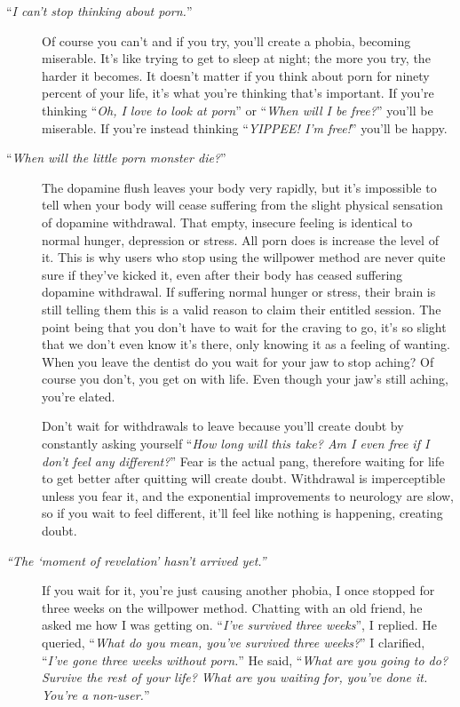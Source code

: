 \documentclass[
]{book}
\begin{document}
\begin{description}
\begin{description}
\item[``\emph{I can't stop thinking about porn.}'']
Of course you can't and if you try, you'll create a phobia, becoming miserable. It's like trying to get to sleep at night; the more you try, the harder it becomes. It doesn't matter if you think about porn for ninety percent of your life, it's what you're thinking that's important. If you're thinking ``\emph{Oh, I love to look at porn}'' or ``\emph{When will I be free?}'' you'll be miserable. If you're instead thinking ``\emph{YIPPEE! I'm free!}'' you'll be happy.
\item[``\emph{When will the little porn monster die?}'']
The dopamine flush leaves your body very rapidly, but it's impossible to tell when your body will cease suffering from the slight physical sensation of dopamine withdrawal. That empty, insecure feeling is identical to normal hunger, depression or stress. All porn does is increase the level of it. This is why users who stop using the willpower method are never quite sure if they've kicked it, even after their body has ceased suffering dopamine withdrawal. If suffering normal hunger or stress, their brain is still telling them this is a valid reason to claim their entitled session. The point being that you don't have to wait for the craving to go, it's so slight that we don't even know it's there, only knowing it as a feeling of wanting. When you leave the dentist do you wait for your jaw to stop aching? Of course you don't, you get on with life. Even though your jaw's still aching, you're elated.

Don't wait for withdrawals to leave because you'll create doubt by constantly asking yourself ``\emph{How long will this take? Am I even free if I don't feel any different?}'' Fear is the actual pang, therefore waiting for life to get better after quitting will create doubt. Withdrawal is imperceptible unless you fear it, and the exponential improvements to neurology are slow, so if you wait to feel different, it'll feel like nothing is happening, creating doubt.
\item[\emph{``The `moment of revelation' hasn't arrived yet.''}]
If you wait for it, you're just causing another phobia, I once stopped for three weeks on the willpower method. Chatting with an old friend, he asked me how I was getting on.
``\emph{I've survived three weeks}'', I replied.
He queried, ``\emph{What do you mean, you've survived three weeks?}''
I clarified, ``\emph{I've gone three weeks without porn.}''
He said, ``\emph{What are you going to do? Survive the rest of your life? What are you waiting for, you've done it. You're a non-user.}''


\end{description}
\end{description}
\end{document}
